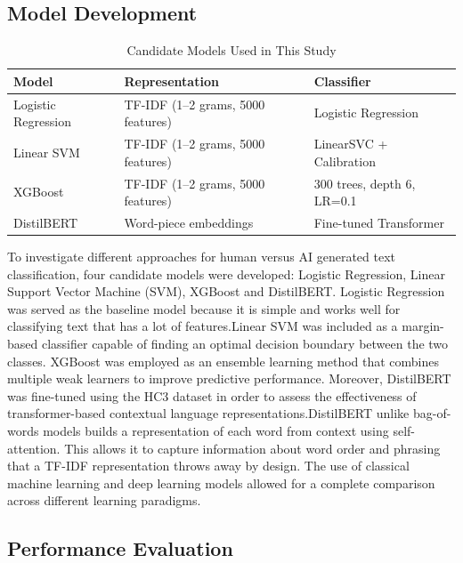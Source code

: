 \documentclass[conference]{IEEEtran}
\begin{document}
\subsection{\textbf{Model Development}}



\begin{table}[htbp]
\caption{Candidate Models Used in This Study}
\label{tab:candidate_models}
\centering
\footnotesize
\begin{tabular}{|p{2.2cm}|p{2.6cm}|p{2.2cm}|}
\hline
\textbf{Model} & \textbf{Representation} & \textbf{Classifier} \\
\hline
Logistic Regression &
TF-IDF (1--2 grams, 5000 features) &
Logistic Regression \\
\hline
Linear SVM &
TF-IDF (1--2 grams, 5000 features) &
LinearSVC + Calibration \\
\hline
XGBoost &
TF-IDF (1--2 grams, 5000 features) &
300 trees, depth 6, LR=0.1 \\
\hline
DistilBERT &
Word-piece embeddings &
Fine-tuned Transformer \\
\hline
\end{tabular}
\end{table}

To investigate different approaches for human versus AI generated text classification, four candidate models were developed: Logistic Regression, Linear Support Vector Machine (SVM), XGBoost and DistilBERT. Logistic Regression was served as the baseline model because it is simple and works well for classifying text that has a lot of features.Linear SVM was included as a margin-based classifier capable of finding an optimal decision boundary between the two classes. XGBoost was employed as an ensemble learning method that combines multiple weak learners to improve predictive performance.
Moreover, DistilBERT was fine-tuned using the HC3 dataset in order to assess the effectiveness of transformer-based contextual language representations.DistilBERT unlike bag-of-words models builds a representation of each word from context using self-attention. This allows it to capture information about word order and phrasing that a TF-IDF representation throws away by design. The use of classical machine learning and deep learning models allowed for a complete comparison across different learning paradigms.

\subsection{\textbf{Performance Evaluation}}
\end{document}
